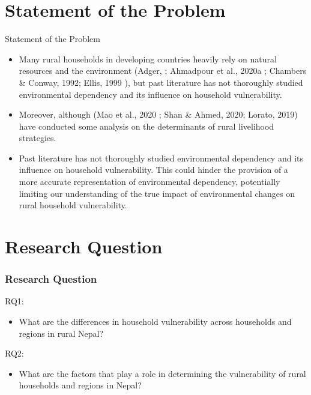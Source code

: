 \documentclass{beamer}
\newcommand{\coloredcite}[2]{\textcolor{blue}{\cite{#2}}}
\begin{document}
	\section{Statement of the Problem}
	\begin{frame}[t]{Statement of the Problem}
		\begin{itemize}
			\item \begin{justify} 
				\small Many rural households in developing countries heavily rely on natural resources and the environment (Adger, \small\coloredcite{}{r15}; Ahmadpour et al., 2020a \small\coloredcite{}{r16}; Chambers & Conway, 1992\small\coloredcite{}{r17}; Ellis, 1999 \small\coloredcite{}{r18}), but past literature has not thoroughly studied environmental dependency and its influence on household vulnerability.  
			\end{justify} 
			
			\item \begin{justify} 
				\small Moreover, although (Mao et al., 2020 \small\coloredcite{}{r19}; Shan & Ahmed, 2020\small\coloredcite{}{r20}; Lorato, 2019) have conducted some analysis on the determinants of rural livelihood strategies. 
			\end{justify}
			
			\item \begin{justify} 
				\small Past literature has not thoroughly studied environmental dependency and its influence on household vulnerability. This could hinder the provision of a more accurate representation of environmental dependency, potentially limiting our understanding of the true impact of environmental changes on rural household vulnerability. \end{justify}  
		\end{itemize}
	\end{frame}
	
	\section{Research Question}
	\begin{frame}[t]
		\frametitle{Research Question}             
		
		\begin{block}{RQ1:}
			\begin{itemize}	
				\item What are the differences in household vulnerability across households and regions in rural Nepal?
			\end{itemize}
		\end{block} 
		\begin{exampleblock}{RQ2:}
			\begin{itemize}	
				\item What are the factors that play a role in determining the vulnerability of rural households and regions in Nepal?
			\end{itemize}
		\end{exampleblock}
	\end{frame}
	
\end{document}
